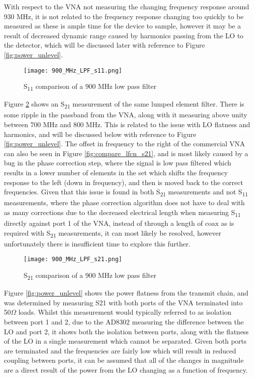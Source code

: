 With respect to the VNA not measuring the changing frequency response around 930 MHz, it is not related to the frequency response changing too quickly to be measured as these is ample time for the device to sample, however it may be a result of decreased dynamic range caused by harmonics passing from the LO to the detector, which will be discussed later with reference to Figure \ref{fig:power_unlevel}. 
\begin{figure}[H]
	\centering
	\texttt{[image: 900\_MHz\_LPF\_s11.png]}
	\caption{S\textsubscript{11} comparison of a 900 MHz low pass filter}
	\label{fig:compare_900_s11}
\end{figure}

Figure \ref{fig:compare_900_s21} shows an S\textsubscript{21} measurement of the same lumped element filter. There is some ripple in the passband from the VNA, along with it measuring above unity between 700 MHz and 800 MHz. This is related to the issue with LO flatness and harmonics, and will be discussed below with reference to Figure \ref{fig:power_unlevel}. The offset in frequency to the right of the commercial VNA can also be seen in Figure \ref{fig:compare_lfcn_s21}, and is most likely caused by a bug in the phase correction step, where the signal is low pass filtered which results in a lower number of elements in the set which shifts the frequency response to the left (down in frequency), and then is moved back to the correct frequencies. Given that this issue is found in both S\textsubscript{21} measurements and not S\textsubscript{11} measurements, where the phase correction algorithm does not have to deal with as many corrections due to the decreased electrical length when measuring S\textsubscript{11} directly against port 1 of the VNA, instead of through a length of coax as is required with S\textsubscript{21} measurements, it can most likely be resolved, however unfortunately there is insufficient time to explore this further. 

\begin{figure}[H]
	\centering
	\texttt{[image: 900\_MHz\_LPF\_s21.png]}
	\caption{S\textsubscript{21} comparison of a 900 MHz low pass filter}
	\label{fig:compare_900_s21}
\end{figure}

Figure \ref{fig:power_unlevel} shows the power flatness from the transmit chain, and was determined by measuring S21 with both ports of the VNA terminated into 50$\Omega$ loads. Whilst this measurement would typically referred to as isolation between port 1 and 2, due to the AD8302 measuring the difference between the LO and port 2, it shows both the isolation between ports, along with the flatness of the LO in a single measurement which cannot be separated. Given both ports are terminated and the frequencies are fairly low which will result in reduced coupling between ports, it can be assumed that all of the changes in magnitude are a direct result of the power from the LO changing as a function of frequency. 

